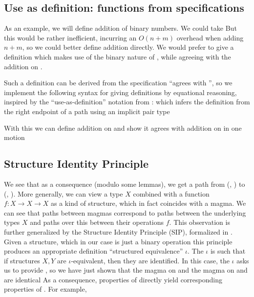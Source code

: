 \subsection{Use as definition: functions from specifications}\label{ssec:useas}
As an example, we will define addition of binary numbers. We could take
But this would be rather inefficient, incurring an $O(n + m)$ overhead when adding $n + m$, so we could better define addition directly. We would prefer to give a definition which makes use of the binary nature of \bL{}, while agreeing with the addition on \bN{}.

Such a definition can be derived from the specification ``agrees with \AgdaFunction{\_+\_}'', so we implement the following syntax for giving definitions by equational reasoning, inspired by the ``use-as-definition'' notation from \cite{calcdata}:
which infers the definition from the right endpoint of a path using an implicit pair type

With this we can define addition on \bL{} and show it agrees with addition on \bN{} in one motion

\subsection{Structure Identity Principle}
We see that as a consequence (modulo some  lemmas), we get a path from (\bN{}, ) to (\bL{}, ). More generally, we can view a type $X$ combined with a function $f: X \to X \to X$ as a kind of structure, which in fact coincides with a magma. We can see that paths between magmas correspond to paths between the underlying types $X$ and paths over this between their operations $f$. This observation is further generalized by the Structure Identity Principle (SIP), formalized in \cite{iri}. Given a structure, which in our case is just a binary operation
this principle produces an appropriate definition ``structured equivalence'' $\iota$. The $\iota$ is such that if structures $X, Y$ are $\iota$-equivalent, then they are identified. In this case, the $\iota$ asks us to provide , so we have just shown that the  magma on \bL{}
and the \AgdaFunction{\_+\_} magma on \bN{} and are identical
As a consequence, properties of \AgdaFunction{\_+\_} directly yield corresponding properties of . For example,
